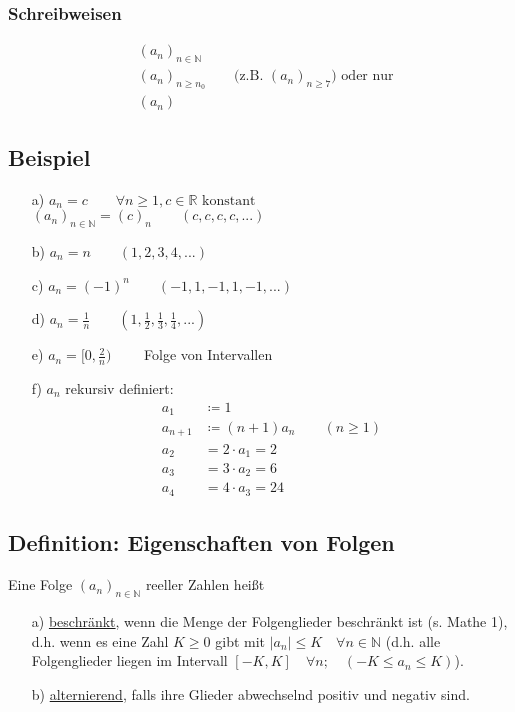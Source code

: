 \documentclass[12pt, titlepage]{article}
\newcommand{\R}{\mathds{R}}
\newcommand{\N}{\mathds{N}}
\renewcommand{\>}{\rightarrow}
\renewcommand{\*}{\cdot}
\begin{document}
	\subsubsection*{Schreibweisen}
	\begin{align*}
		&(a_n)_{n\in\N}\\
		&(a_n)_{n\geq n_0}\qquad \textrm{(z.B. $(a_n)_{n\geq 7}$) oder nur}\\
		&(a_n)
	\end{align*}
	\subsection{Beispiel}
	\begin{itemize}
		\item[a)] $a_n=c\qquad\forall n\geq 1, c\in\R\textrm{ konstant}$\\
		$(a_n)_{n\in\N}=(c)_n\qquad (c,c,c,c,...)$
		\item[b)] $a_n=n\qquad (1, 2, 3,4,...)$
		\item[c)] $a_n=(-1)^n\qquad (-1,1,-1,1,-1,...)$
		\item[d)] $a_n=\frac{1}{n}\qquad(1,\frac{1}{2},\frac{1}{3},\frac{1}{4},...)$
		\item[e)] $a_n=[0,\frac{2}{n})\qquad$ Folge von Intervallen
		\item[f)] $a_n$ rekursiv definiert:\\
		\begin{align*}
			a_1&\coloneqq 1\\
			a_{n+1}&\coloneqq(n+1)a_n\qquad(n\geq 1)\\
			a_2&=2\*a_1=2\\
			a_3&=3\*a_2=6\\
			a_4&=4\*a_3=24
		\end{align*}
	\end{itemize}
	\subsection{Definition: Eigenschaften von Folgen}
	Eine Folge $(a_n)_{n\in\N}$ reeller Zahlen heißt
	\begin{itemize}
		\item[a)] \underline{beschränkt}, wenn die Menge der Folgenglieder beschränkt ist (s. Mathe 1), d.h. wenn es eine Zahl $K\geq 0$ gibt mit $|a_n|\leq K\quad\forall n\in\N$ (d.h. alle Folgenglieder liegen im Intervall $[-K,K]\quad\forall n;\quad(-K\leq a_n\leq K)$).
		\item[b)] \underline{alternierend}, falls ihre Glieder abwechselnd positiv und negativ sind.
	\end{itemize}
\end{document}
